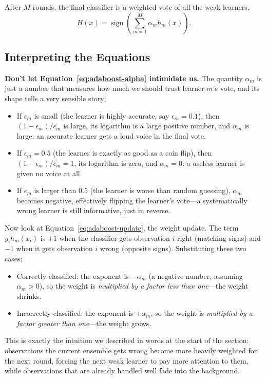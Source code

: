 \documentclass[12pt,a4paper]{article}
\begin{document}
After $M$ rounds, the final classifier is a weighted vote of all the weak learners,
$$
H(x) = \operatorname{sign}\!\left(\sum_{m=1}^{M} \alpha_m h_m(x)\right).
$$

\subsection{Interpreting the Equations}

\textbf{Don't let Equation~\eqref{eq:adaboost-alpha} intimidate us.} The quantity $\alpha_m$ is just a number that measures how much we should trust learner $m$'s vote, and its shape tells a very sensible story:

\begin{itemize}[nosep]
    \item If $\epsilon_m$ is small (the learner is highly accurate, say $\epsilon_m = 0.1$), then $(1-\epsilon_m)/\epsilon_m$ is large, its logarithm is a large positive number, and $\alpha_m$ is large: an accurate learner gets a loud voice in the final vote.
    \item If $\epsilon_m = 0.5$ (the learner is exactly as good as a coin flip), then $(1-\epsilon_m)/\epsilon_m = 1$, its logarithm is zero, and $\alpha_m = 0$: a useless learner is given no voice at all.
    \item If $\epsilon_m$ is larger than $0.5$ (the learner is worse than random guessing), $\alpha_m$ becomes negative, effectively flipping the learner's vote---a systematically wrong learner is still informative, just in reverse.
\end{itemize}

Now look at Equation~\eqref{eq:adaboost-update}, the weight update. The term $y_i h_m(x_i)$ is $+1$ when the classifier gets observation $i$ right (matching signs) and $-1$ when it gets observation $i$ wrong (opposite signs). Substituting these two cases:

\begin{itemize}[nosep]
    \item Correctly classified: the exponent is $-\alpha_m$ (a negative number, assuming $\alpha_m > 0$), so the weight is \emph{multiplied by a factor less than one}---the weight shrinks.
    \item Incorrectly classified: the exponent is $+\alpha_m$, so the weight is \emph{multiplied by a factor greater than one}---the weight grows.
\end{itemize}

This is exactly the intuition we described in words at the start of the section: observations the current ensemble gets wrong become more heavily weighted for the next round, forcing the next weak learner to pay more attention to them, while observations that are already handled well fade into the background.
\end{document}
